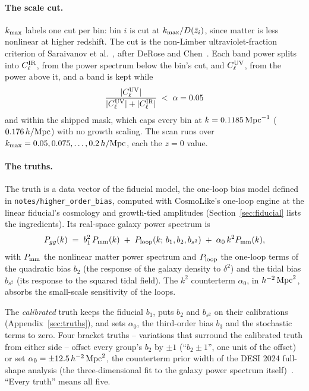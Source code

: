 \documentclass[11pt]{article}
\newcommand{\kmax}{k_{\rm max}}
\newcommand{\hMpc}{\,h/{\rm Mpc}}
\begin{document}
\paragraph{The scale cut.}
$\kmax$ labels one cut per bin: bin $i$ is cut at
$\kmax/D(\bar{z}_i)$, since matter is less nonlinear at higher
redshift.  The cut is the non-Limber ultraviolet-fraction criterion of
Saraivanov et al.~\cite{Saraivanov2026}, after DeRose and
Chen~\cite{DeRoseChen2025}.  Each band power splits into
$C_\ell^{\rm IR}$, from the power spectrum below the bin's cut, and
$C_\ell^{\rm UV}$, from the power above it, and a band is kept while
\begin{equation}
  \frac{|C_\ell^{\rm UV}|}{|C_\ell^{\rm UV}| + |C_\ell^{\rm IR}|}
  \;<\; \alpha = 0.05
  \label{eq:uvfraction}
\end{equation}
and within the shipped mask, which caps every bin at
$k = 0.1185\,{\rm Mpc}^{-1}$ ($0.176\hMpc$) with no growth scaling.
The scan runs over $\kmax = 0.05, 0.075, \ldots, 0.2\hMpc$, each the
$z = 0$ value.

\paragraph{The truths.}
The truth is a data vector of the fiducial model, the one-loop bias
model defined in \texttt{notes/higher\_order\_bias}, computed with CosmoLike's
one-loop engine at the linear fiducial's cosmology and growth-tied
amplitudes (Section~\ref{sec:fiducial} lists the ingredients).  Its
real-space galaxy power spectrum is
\begin{equation}
  P_{gg}(k) \;=\; b_1^2\,P_{\rm mm}(k)
  \;+\; P_{\rm loop}(k;\, b_1, b_2, b_{s^2})
  \;+\; \alpha_0\,k^2 P_{\rm mm}(k) ,
  \label{eq:modela}
\end{equation}
with $P_{\rm mm}$ the nonlinear matter power spectrum and
$P_{\rm loop}$ the one-loop terms of the quadratic bias $b_2$ (the
response of the galaxy density to $\delta^2$) and the tidal bias
$b_{s^2}$ (its response to the squared tidal field).  The $k^2$
counterterm $\alpha_0$, in $h^{-2}\,{\rm Mpc}^2$, absorbs the
small-scale sensitivity of the loops.

The \emph{calibrated} truth keeps the fiducial $b_1$, puts $b_2$ and
$b_{s^2}$ on their calibrations (Appendix~\ref{sec:truths}), and sets
$\alpha_0$, the third-order bias $b_3$ and the stochastic terms to
zero.  Four bracket truths -- variations that surround the calibrated
truth from either side -- offset every group's $b_2$ by $\pm 1$
(``$b_2 \pm 1$'', one unit of the offset) or set
$\alpha_0 = \pm 12.5\,h^{-2}\,{\rm Mpc}^2$, the counterterm prior
width of the DESI 2024 full-shape analysis (the three-dimensional fit
to the galaxy power spectrum itself)~\cite{DESI2024V}.  ``Every
truth'' means all five.
\end{document}
